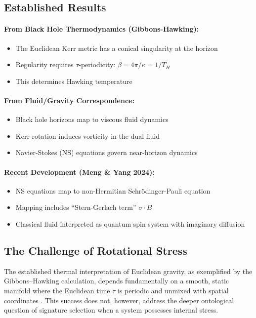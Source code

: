 \documentclass[11pt]{article}
\begin{document}
\subsection{Established Results}

\paragraph{From Black Hole Thermodynamics (Gibbons-Hawking\cite{GibbonsHawking1977}):}
\begin{itemize}
\item The Euclidean Kerr metric\cite{Kerr1963} has a conical singularity at the horizon
\item Regularity requires $\tau$-periodicity: $\beta = 4\pi/\kappa = 1/T_H$
\item This determines Hawking temperature
\end{itemize}

\paragraph{From Fluid/Gravity Correspondence\cite{FluidGravity2008}:}
\begin{itemize}
\item Black hole horizons map to viscous fluid dynamics
\item Kerr rotation induces vorticity in the dual fluid
\item Navier-Stokes\cite{NavierStokesMillennium} (NS) equations govern near-horizon dynamics
\end{itemize}

\paragraph{Recent Development (Meng \& Yang 2024):}
\begin{itemize}
\item NS equations map to non-Hermitian Schr\"odinger-Pauli equation
\item Mapping includes ``Stern-Gerlach\cite{SternGerlach1922} term'' $\sigma \cdot B$
\item Classical fluid interpreted as quantum spin system with imaginary diffusion
\end{itemize}
\subsection{The Challenge of Rotational Stress}

The established thermal interpretation of Euclidean gravity, as exemplified by the Gibbons--Hawking calculation, depends fundamentally on a smooth, static manifold where the Euclidean time $\tau$ is periodic and unmixed with spatial coordinates \cite{GibbonsHawking1977}.
This success does not, however, address the deeper ontological question of signature selection when a system possesses internal stress.
\end{document}
